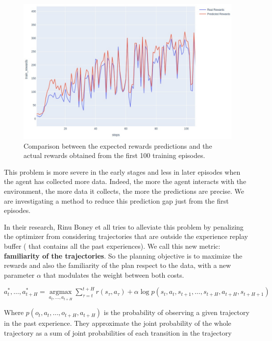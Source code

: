 \begin{figure}[H]
\label{fig:original_rew_vs_pred}
\centering
\includegraphics[width=1. \textwidth, height=.35\textheight]{pictures/original_pred_vs_real_rew}
\caption{ Comparison between the expected rewards predictions and the actual rewards obtained from the first 100 training episodes. }
\end{figure}
This problem is more severe in the early stages and less in later episodes when the agent has collected more data. Indeed, the more the agent interacts with the environment, the more data it collects, the more the predictions are precise. We are investigating a method to reduce this prediction gap just from the first episodes.

In their research, Rinu Boney et all \cite{boney2019regularizing} tries to alleviate this problem by penalizing the optimizer from considering trajectories that are outside the experience replay buffer ( that contains all the past experiences).
We call this new metric: \textbf{familiarity of the trajectories}.
So the planning objective is to maximize the rewards and also the familiarity of the plan respect to the data, with a new parameter $\alpha$ that modulates the weight between both costs.

$a_{t}^{*}, \ldots, a_{t+H}^{*}=\underset{a_{t}, \ldots, a_{t+H}}{\operatorname{argmax}} \sum_{\tau=t}^{t+H} r\left(s_{\tau}, a_{\tau}\right)+\alpha \log p\left(s_{t}, a_{t}, s_{t+1}, \ldots, s_{t+H}, a_{t+H}, s_{t+H+1}\right)$

Where $p(o_t, a_t, . . . , o_{t+H}, a_{t+H})$ is the probability of observing a given trajectory in the past experience.
They approximate the joint probability
of the whole trajectory as a sum of joint probabilities of each transition in the trajectory

